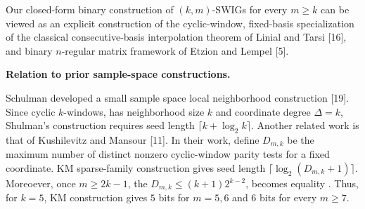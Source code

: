 


Our closed-form binary construction of $(k,m)$-SWIGs for every $m\geq k$
can be viewed as an explicit construction of the cyclic-window, fixed-basis
specialization of the classical consecutive-basis interpolation theorem of
Linial and Tarsi [16], and binary
$n$-regular matrix framework of Etzion and Lempel [5].\par




\par\medskip\noindent\textbf{Relation to prior sample-space constructions.}\par




Schulman developed a small sample space local neighborhood
construction [19]. Since cyclic $k$-windows, has neighborhood size $k$ and coordinate degree
$\Delta=k$, Shulman’s construction requires seed length $\lceil k+\log_{2}k\rceil$. Another related work is that of
Kushilevitz and Mansour [11]. In their work,
define $D_{m,k}$ be the maximum number
of distinct nonzero cyclic-window parity tests for a fixed
coordinate. KM sparse-family construction gives seed length
$\lceil\log_{2}(D_{m,k}+1)\rceil$. Moreoever, once $m\geq 2k-1$, the
$D_{m,k}\leq(k+1)2^{k-2}$, becomes equality . Thus,
for $k=5$, KM construction gives $5$ bits for $m=5,6$
and $6$ bits for every $m\geq 7$.\par




